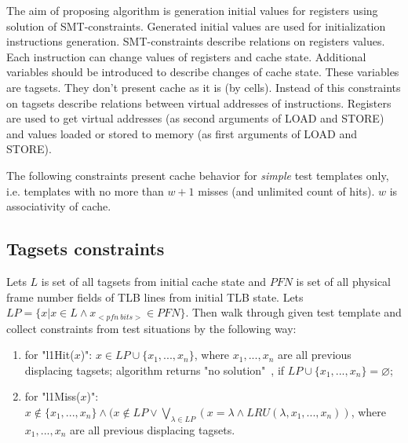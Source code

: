 \documentclass[times, 10pt,twocolumn]{article}
\begin{document}
The aim of proposing algorithm is generation initial values for registers using solution of SMT-constraints. Generated initial values are used for initialization instructions generation. SMT-constraints describe relations on registers values. Each instruction can change values of registers and cache state. Additional variables should be introduced to describe changes of cache state. These variables are tagsets. They don't present cache as it is (by cells). Instead of this constraints on tagsets describe relations between virtual addresses of instructions. Registers are used to get virtual addresses (as second arguments of LOAD and STORE) and values loaded or stored to memory (as first arguments of LOAD and STORE).

The following constraints present cache behavior for \emph{simple} test templates only, i.e. templates with no more than $w+1$ misses (and unlimited count of hits). $w$ is associativity of cache.

\subsection{Tagsets constraints}
Lets $L$ is set of all tagsets from initial cache state and $PFN$ is
set of all physical frame number fields of TLB lines from initial
TLB state. Lets $LP = \{ x | x \in L \wedge x_{<pfn~bits>} \in
PFN\}$. Then walk through given test template and collect
constraints from test situations by the following way:
\begin{enumerate} \item for "l1Hit($x$)": $x \in LP \cup \{ x_1,
..., x_n \}$, where $x_1, ..., x_n$ are all previous displacing
tagsets; algorithm returns "no solution"\ , if $LP \cup \{ x_1, ...,
x_n \} = \varnothing$; \item for "l1Miss($x$)": $x \notin \{x_1,
..., x_n \} \wedge (x \notin LP \vee \bigvee_{\lambda \in LP} (x =
\lambda \wedge LRU(\lambda, x_1, ..., x_n))$, where $x_1, ..., x_n$
are all previous displacing tagsets. \end{enumerate}
\end{document}
